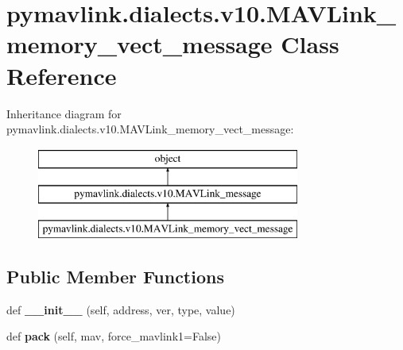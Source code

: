 \hypertarget{classpymavlink_1_1dialects_1_1v10_1_1MAVLink__memory__vect__message}{}\section{pymavlink.\+dialects.\+v10.\+M\+A\+V\+Link\+\_\+memory\+\_\+vect\+\_\+message Class Reference}
\label{classpymavlink_1_1dialects_1_1v10_1_1MAVLink__memory__vect__message}
Inheritance diagram for pymavlink.\+dialects.\+v10.\+M\+A\+V\+Link\+\_\+memory\+\_\+vect\+\_\+message\+:\begin{figure}[H]
\begin{center}
\leavevmode
\includegraphics[height=3.000000cm]{classpymavlink_1_1dialects_1_1v10_1_1MAVLink__memory__vect__message}
\end{center}
\end{figure}
\subsection*{Public Member Functions}
\begin{DoxyCompactItemize}
\item 
\mbox{\label{classpymavlink_1_1dialects_1_1v10_1_1MAVLink__memory__vect__message_aab5eaa12a625ec11b75a199305998258}} 
def {\bfseries \+\_\+\+\_\+init\+\_\+\+\_\+} (self, address, ver, type, value)
\item 
\mbox{\label{classpymavlink_1_1dialects_1_1v10_1_1MAVLink__memory__vect__message_a7af15668af08c5014e43d2b3d34c8099}} 
def {\bfseries pack} (self, mav, force\+\_\+mavlink1=False)
\end{DoxyCompactItemize}
